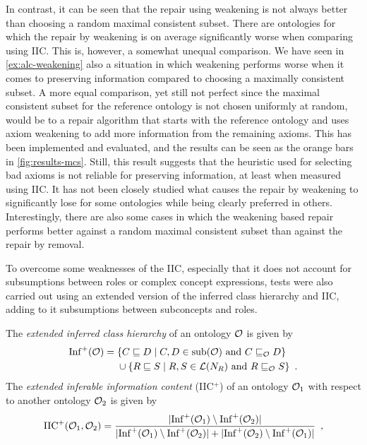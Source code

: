 In contrast, it can be seen that the repair using weakening is not always better than choosing a random maximal consistent subset. There are ontologies for which the repair by weakening is on average significantly worse when comparing using IIC. This is, however, a somewhat unequal comparison. We have seen in \cref{ex:alc-weakening} also a situation in which weakening performs worse when it comes to preserving information compared to choosing a maximally consistent subset. A more equal comparison, yet still not perfect since the maximal consistent subset for the reference ontology is not chosen uniformly at random, would be to a repair algorithm that starts with the reference ontology and uses axiom weakening to add more information from the remaining axioms. This has been implemented and evaluated, and the results can be seen as the orange bars in \cref{fig:results-mcs}. Still, this result suggests that the heuristic used for selecting bad axioms is not reliable for preserving information, at least when measured using IIC. It has not been closely studied what causes the repair by weakening to significantly lose for some ontologies while being clearly preferred in others. Interestingly, there are also some cases in which the weakening based repair performs better against a random maximal consistent subset than against the repair by removal.

To overcome some weaknesses of the IIC, especially that it does not account for subsumptions between roles or complex concept expressions, tests were also carried out using an extended version of the inferred class hierarchy and IIC, adding to it subsumptions between subconcepts and roles.

\begin{definition}
  The \emph{extended inferred class hierarchy} of an ontology $\mathcal{O}$ is given by
  \begin{align*}
    {\ensuremath{\operatorname{Inf}}}^+(\mathcal{O}) ={} & \{ C \sqsubseteq D \mid C, D \in {\ensuremath{\operatorname{sub}}}(\mathcal{O}) \text{ and } C \sqsubseteq_\mathcal{O} D \} \\
    & \cup \{ R \sqsubseteq S \mid R, S \in \mathcal{L}(N_R) \text{ and } R \sqsubseteq_\mathcal{O} S \} \enspace.
  \end{align*}
  The \emph{extended inferable information content} (IIC$^+$) of an ontology $\mathcal{O}_1$ with respect to another ontology $\mathcal{O}_2$ is given by
  \begin{align*}
    {\ensuremath{\operatorname{IIC}}}^+(\mathcal{O}_1, \mathcal{O}_2) = \frac{| {\operatorname{Inf}}^+(\mathcal{O}_1) \setminus {\ensuremath{\operatorname{Inf}}}^+(\mathcal{O}_2) |}{|{\operatorname{Inf}}^+(\mathcal{O}_1) \setminus {\ensuremath{\operatorname{Inf}}}^+(\mathcal{O}_2)| + |{\operatorname{Inf}}^+(\mathcal{O}_2) \setminus {\ensuremath{\operatorname{Inf}}}^+(\mathcal{O}_1)|} \enspace,
  \end{align*}
\end{definition}

